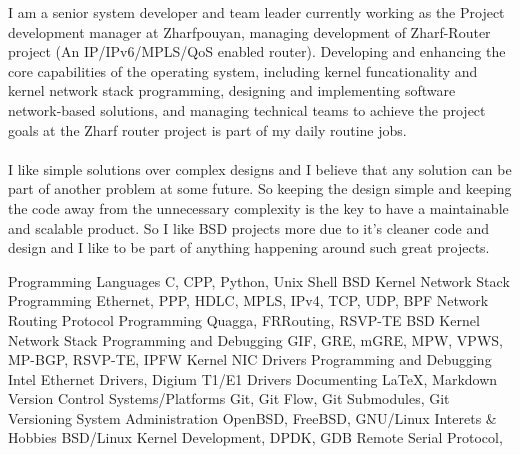 \documentclass[12pt]{developercv}
\begin{document}
\begin{minipage}[t]{1\textwidth}
I am a senior system developer and team leader currently working
as the Project development manager at Zharfpouyan, managing development
of Zharf-Router project (An IP/IPv6/MPLS/QoS enabled router).
Developing and enhancing the core capabilities of the operating system,
including kernel funcationality and kernel network stack programming,
designing and implementing software network-based solutions, and managing
technical teams to achieve the project goals at the Zharf router project is
part of my daily routine jobs.
\\
\\
I like simple solutions over complex designs and I believe that any solution
can be part of another problem at some future. So keeping the design simple and
keeping the code away from the unnecessary complexity is the key to have a
maintainable and scalable product. So I like BSD projects more due to it's cleaner
code and design and I like to be part of anything happening around such great projects.

\end{minipage}
\hfill %
%

\begin{entrylist}
	\entry
		{}
		{Programming Languages}
		{}
		{C, CPP, Python, Unix Shell}
	\entry
		{}
		{BSD Kernel Network Stack Programming}
		{}
		{Ethernet, PPP, HDLC, MPLS, IPv4, TCP, UDP, BPF}
	\entry
		{}
		{Network Routing Protocol Programming}
		{}
		{Quagga, FRRouting, RSVP-TE}
	\entry
		{}
		{BSD Kernel Network Stack Programming and Debugging}
		{}
		{GIF, GRE, mGRE, MPW, VPWS, MP-BGP, RSVP-TE, IPFW}
	\entry
		{}
		{Kernel NIC Drivers Programming and Debugging}
		{}
		{Intel Ethernet Drivers, Digium T1/E1 Drivers} %
	\entry
		{}
		{Documenting}
		{}
		{\LaTeX, Markdown}
	\entry
		{}
		{Version Control Systems/Platforms}
		{}
		{Git, Git Flow, Git Submodules, Git Versioning}
	\entry
		{}
		{System Administration}
		{}
		{OpenBSD, FreeBSD, GNU/Linux}
	\entry
		{}
		{Interets \& Hobbies}
		{}
		{BSD/Linux Kernel Development, DPDK, GDB Remote Serial Protocol, }
\end{entrylist}
\end{document}
